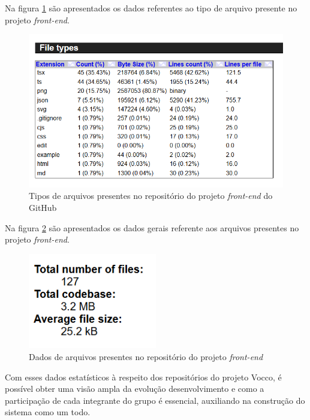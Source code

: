 Na figura \ref{fig:tiposdeArquivosFront} são apresentados os dados referentes ao tipo de arquivo presente no projeto \textit{front-end}.

\begin{figure}[ht]
        \centering
\includegraphics[width=1.0\textwidth]{images/tipo-arquivos-stats-front.png}
        \caption{Tipos de arquivos presentes no repositório do projeto \textit{front-end} do GitHub}
        \label{fig:tiposdeArquivosFront}
    \end{figure}

\newpage


Na figura \ref{fig:infoArquivosFront} são apresentados os dados gerais referente aos arquivos presentes no projeto \textit{front-end}.

    \begin{figure}[ht]
        \centering
\includegraphics[width=0.5\textwidth]{images/info-arquivos-stats-front.png}
        \caption{Dados de arquivos presentes no repositório do projeto \textit{front-end}}
        \label{fig:infoArquivosFront}
    \end{figure}


Com esses dados estatísticos à respeito dos repositórios do projeto Vocco, é possível obter uma visão ampla da evolução desenvolvimento e como a participação de cada integrante do grupo é essencial, auxiliando na construção do sistema como um todo.